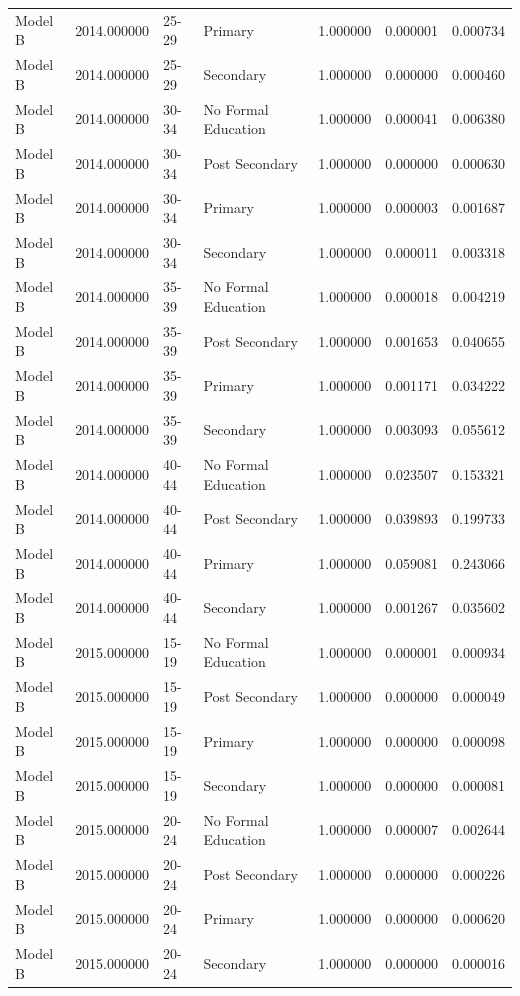 \begin{table}[ht]
\begin{tabular}{lrllrrr}
Model B & 2014.000000 & 25-29 & Primary & 1.000000 & 0.000001 & 0.000734 \\
Model B & 2014.000000 & 25-29 & Secondary & 1.000000 & 0.000000 & 0.000460 \\
Model B & 2014.000000 & 30-34 & No Formal Education & 1.000000 & 0.000041 & 0.006380 \\
Model B & 2014.000000 & 30-34 & Post Secondary & 1.000000 & 0.000000 & 0.000630 \\
Model B & 2014.000000 & 30-34 & Primary & 1.000000 & 0.000003 & 0.001687 \\
Model B & 2014.000000 & 30-34 & Secondary & 1.000000 & 0.000011 & 0.003318 \\
Model B & 2014.000000 & 35-39 & No Formal Education & 1.000000 & 0.000018 & 0.004219 \\
Model B & 2014.000000 & 35-39 & Post Secondary & 1.000000 & 0.001653 & 0.040655 \\
Model B & 2014.000000 & 35-39 & Primary & 1.000000 & 0.001171 & 0.034222 \\
Model B & 2014.000000 & 35-39 & Secondary & 1.000000 & 0.003093 & 0.055612 \\
Model B & 2014.000000 & 40-44 & No Formal Education & 1.000000 & 0.023507 & 0.153321 \\
Model B & 2014.000000 & 40-44 & Post Secondary & 1.000000 & 0.039893 & 0.199733 \\
Model B & 2014.000000 & 40-44 & Primary & 1.000000 & 0.059081 & 0.243066 \\
Model B & 2014.000000 & 40-44 & Secondary & 1.000000 & 0.001267 & 0.035602 \\
Model B & 2015.000000 & 15-19 & No Formal Education & 1.000000 & 0.000001 & 0.000934 \\
Model B & 2015.000000 & 15-19 & Post Secondary & 1.000000 & 0.000000 & 0.000049 \\
Model B & 2015.000000 & 15-19 & Primary & 1.000000 & 0.000000 & 0.000098 \\
Model B & 2015.000000 & 15-19 & Secondary & 1.000000 & 0.000000 & 0.000081 \\
Model B & 2015.000000 & 20-24 & No Formal Education & 1.000000 & 0.000007 & 0.002644 \\
Model B & 2015.000000 & 20-24 & Post Secondary & 1.000000 & 0.000000 & 0.000226 \\
Model B & 2015.000000 & 20-24 & Primary & 1.000000 & 0.000000 & 0.000620 \\
Model B & 2015.000000 & 20-24 & Secondary & 1.000000 & 0.000000 & 0.000016 \\

\end{tabular}
\end{table}
